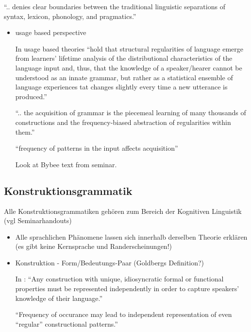 ``.. denies clear boundaries between the traditional linguistic separations of syntax, lexicon, phonology, and pragmatics.''
\begin{itemize}
    \item usage based perspective

        In \cite{Ellis08} usage based theories ``hold that structural regularities of language emerge from learners' lifetime analysis of the distributional characteristics of the language input and, thus, that the knowledge of a speaker/hearer cannot be understood as an innate grammar, but rather as a statistical ensemble of language experiences tat changes slightly every time a new utterance is produced.''

        ``.. the acquisition of grammar is the piecemeal learning of many thousands of constructions and the frequency-biased abstraction of regularities within them.''

        ``frequency of patterns in the input affects acquisition''

        Look at Bybee text from seminar.

\end{itemize}


\subsection{Konstruktionsgrammatik}
Alle Konstruktionsgrammatiken gehören zum Bereich der Kognitiven Linguistik (vgl Seminarhandouts)

\begin{itemize}
\item Alle sprachlichen Phänomene lassen sich innerhalb derselben Theorie erklären (es gibt keine Kernsprache und Randerscheinungen!)
\item Konstruktion - Form/Bedeutungs-Paar (Goldbergs Definition?)

    In \cite{Ellis08}: ``Any construction with unique, idiosyncratic formal or functional properties must be represented independently in order to capture speakers' knowledge of their language.''

    ``Frequency of occurance may lead to independent representation of even ``regular'' constructional patterns.''
\end{itemize}

